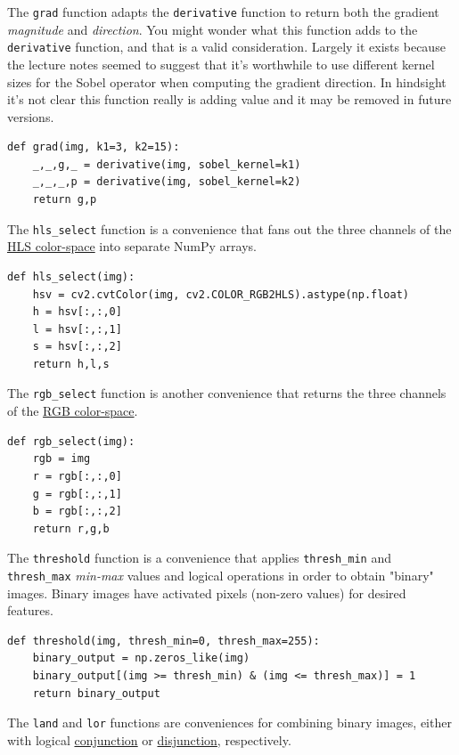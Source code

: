 \documentclass[11pt]{article}
\begin{document}
The \texttt{grad} function adapts the \texttt{derivative} function to return
both the gradient \emph{magnitude} and \emph{direction}.  You might wonder
what this function adds to the \texttt{derivative} function, and that
is a valid consideration.  Largely it exists because the lecture
notes seemed to suggest that it's worthwhile to use different
kernel sizes for the Sobel operator when computing the gradient
direction.  In hindsight it's not clear this function really is
adding value and it may be removed in future versions.

\begin{verbatim}
def grad(img, k1=3, k2=15):
    _,_,g,_ = derivative(img, sobel_kernel=k1)
    _,_,_,p = derivative(img, sobel_kernel=k2)
    return g,p
\end{verbatim}

The \texttt{hls\_select} function is a convenience that fans out the
three channels of the \href{https://en.wikipedia.org/wiki/HSL_and_HSV}{HLS color-space} into separate NumPy
arrays.  

\begin{verbatim}
def hls_select(img):
    hsv = cv2.cvtColor(img, cv2.COLOR_RGB2HLS).astype(np.float)
    h = hsv[:,:,0]
    l = hsv[:,:,1]
    s = hsv[:,:,2]
    return h,l,s
\end{verbatim}

The \texttt{rgb\_select} function is another convenience that returns
the three channels of the \href{https://en.wikipedia.org/wiki/RGB_color_space}{RGB color-space}.

\begin{verbatim}
def rgb_select(img):
    rgb = img
    r = rgb[:,:,0]
    g = rgb[:,:,1]
    b = rgb[:,:,2]
    return r,g,b
\end{verbatim}

The \texttt{threshold} function is a convenience that applies
\texttt{thresh\_min} and \texttt{thresh\_max} \emph{min-max} values and logical
operations in order to obtain "binary" images.  Binary images
have activated pixels (non-zero values) for desired features.

\begin{verbatim}
def threshold(img, thresh_min=0, thresh_max=255):
    binary_output = np.zeros_like(img)
    binary_output[(img >= thresh_min) & (img <= thresh_max)] = 1
    return binary_output
\end{verbatim}

The \texttt{land} and \texttt{lor} functions are conveniences for combining
binary images, either with logical \href{https://en.wikipedia.org/wiki/Logical_conjunction}{conjunction} or \href{https://en.wikipedia.org/wiki/Logical_disjunction}{disjunction},
respectively.  
\end{document}
